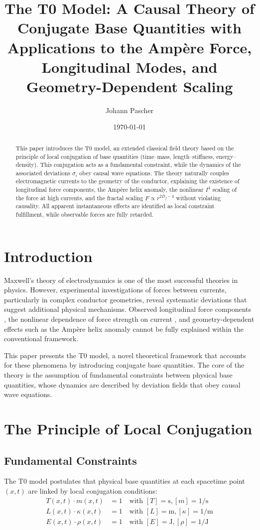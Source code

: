 \documentclass[10pt, a4paper]{article}
\title{The T0 Model: A Causal Theory of Conjugate Base Quantities with Applications to the Ampère Force, Longitudinal Modes, and Geometry-Dependent Scaling}
\author{Johann Pascher}
\date{\today}
\begin{document}
	
	\maketitle
	
	\begin{abstract}
		This paper introduces the T0 model, an extended classical field theory based on the principle of local conjugation of base quantities (time--mass, length--stiffness, energy--density). This conjugation acts as a fundamental constraint, while the dynamics of the associated deviations $\sigma_i$ obey causal wave equations. The theory naturally couples electromagnetic currents to the geometry of the conductor, explaining the existence of longitudinal force components, the Ampère helix anomaly, the nonlinear $I^4$ scaling of the force at high currents, and the fractal scaling $F \propto r^{2D_f - 4}$ without violating causality. All apparent instantaneous effects are identified as local constraint fulfillment, while observable forces are fully retarded.
	\end{abstract}
	
	\section{Introduction}
	Maxwell's theory of electrodynamics is one of the most successful theories in physics. However, experimental investigations of forces between currents, particularly in complex conductor geometries, reveal systematic deviations that suggest additional physical mechanisms. Observed longitudinal force components \cite{graneau1985}, the nonlinear dependence of force strength on current \cite{graneau2001}, and geometry-dependent effects such as the Ampère helix anomaly \cite{moore1988} cannot be fully explained within the conventional framework.
	
	This paper presents the T0 model, a novel theoretical framework that accounts for these phenomena by introducing conjugate base quantities. The core of the theory is the assumption of fundamental constraints between physical base quantities, whose dynamics are described by deviation fields that obey causal wave equations.
	
	\section{The Principle of Local Conjugation}
	\subsection{Fundamental Constraints}
	The T0 model postulates that physical base quantities at each spacetime point $(x,t)$ are linked by local conjugation conditions:
	\begin{align}
		T(x,t) \cdot m(x,t) &= 1 \quad \text{with } [T] = \text{s}, [m] = 1/\text{s} \label{eq:conj1} \\
		L(x,t) \cdot \kappa(x,t) &= 1 \quad \text{with } [L] = \text{m}, [\kappa] = 1/\text{m} \label{eq:conj2} \\
		E(x,t) \cdot \rho(x,t) &= 1 \quad \text{with } [E] = \text{J}, [\rho] = 1/\text{J} \label{eq:conj3}
	\end{align}
	
\end{document}
